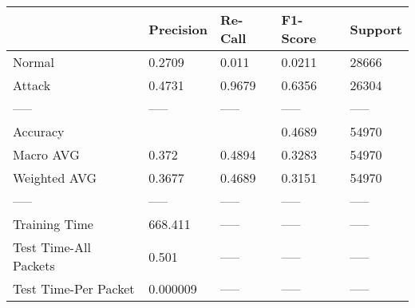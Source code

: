 \begin{tabular}{lllll}
\toprule
{} & Precision & Re-Call & F1-Score & Support \\
\midrule
Normal                &    0.2709 &   0.011 &   0.0211 &   28666 \\
Attack                &    0.4731 &  0.9679 &   0.6356 &   26304 \\
-----                 &     ----- &   ----- &    ----- &   ----- \\
Accuracy              &           &         &   0.4689 &   54970 \\
Macro AVG             &     0.372 &  0.4894 &   0.3283 &   54970 \\
Weighted AVG          &    0.3677 &  0.4689 &   0.3151 &   54970 \\
-----                 &     ----- &   ----- &    ----- &   ----- \\
Training Time         &   668.411 &   ----- &    ----- &   ----- \\
Test Time-All Packets &     0.501 &   ----- &    ----- &   ----- \\
Test Time-Per Packet  &  0.000009 &   ----- &    ----- &   ----- \\
\bottomrule
\end{tabular}
